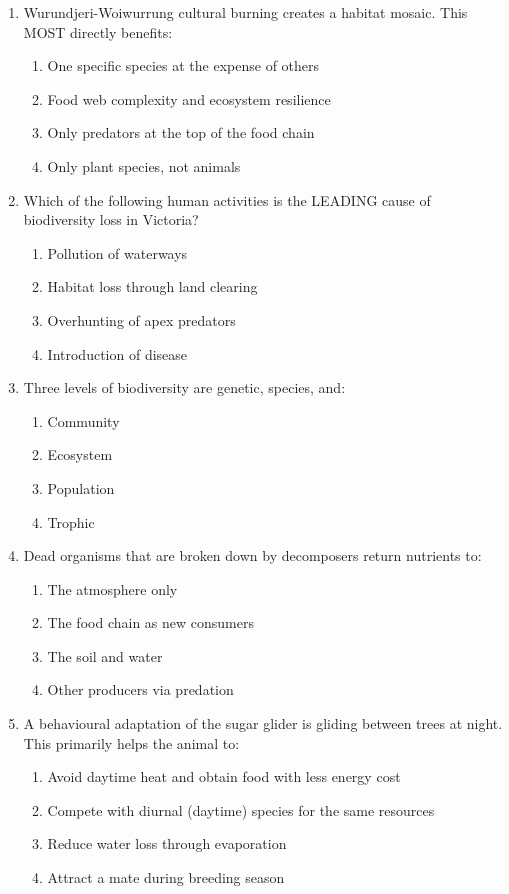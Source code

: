 \documentclass[11pt,a4paper]{article}
\begin{document}
\begin{enumerate}[label=\textbf{\arabic*.}, itemsep=10pt]
\item Wurundjeri-Woiwurrung cultural burning creates a habitat mosaic. This MOST directly benefits:
\begin{enumerate}[label=\Alph*., itemsep=2pt]
  \item One specific species at the expense of others
  \item Food web complexity and ecosystem resilience
  \item Only predators at the top of the food chain
  \item Only plant species, not animals
\end{enumerate}

\item Which of the following human activities is the LEADING cause of biodiversity loss in Victoria?
\begin{enumerate}[label=\Alph*., itemsep=2pt]
  \item Pollution of waterways          \item Habitat loss through land clearing
  \item Overhunting of apex predators   \item Introduction of disease
\end{enumerate}

\item Three levels of biodiversity are genetic, species, and:
\begin{enumerate}[label=\Alph*., itemsep=2pt]
  \item Community    \item Ecosystem    \item Population    \item Trophic
\end{enumerate}

\item Dead organisms that are broken down by decomposers return nutrients to:
\begin{enumerate}[label=\Alph*., itemsep=2pt]
  \item The atmosphere only    \item The food chain as new consumers
  \item The soil and water     \item Other producers via predation
\end{enumerate}

\item A behavioural adaptation of the sugar glider is gliding between trees at night. This primarily helps the animal to:
\begin{enumerate}[label=\Alph*., itemsep=2pt]
  \item Avoid daytime heat and obtain food with less energy cost
  \item Compete with diurnal (daytime) species for the same resources
  \item Reduce water loss through evaporation
  \item Attract a mate during breeding season
\end{enumerate}


\end{enumerate}
\end{document}

